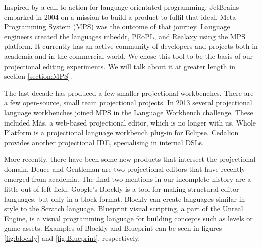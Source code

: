 Inspired by a call to action for language orientated programming\cite{dmitriev2004language}, JetBrains embarked in 2004 on a mission to build a product to fulfil that ideal.  
Meta Programming System (MPS) was the outcome of that journey.   
Language engineers created the languages mbeddr, PEoPL, and Realaxy using the MPS platform.  
It currently has an active community of developers and projects both in academia and in the commercial world. 
We chose this tool to be the basis of our projectional editing experiments. 
We will talk about it at greater length in section \ref{section:MPS}.

The last decade has produced a few smaller projectional workbenches.
There are a few open-source, small team projectional projects. 
In 2013 several projectional language workbenches joined MPS in the Language Workbench challenge\cite{erdweg2015evaluating}.
These included M\'as, a web-based projectional editor, which is no longer with us\cite{MasPostMortem}.
Whole Platform\cite{WholePlatformProductPage} is a projectional language workbench plug-in for Eclipse.
Cedalion\cite{lorenz2011cedalion} provides another projectional IDE, specialising in internal DSLs.

More recently, there have been some new products that intersect the projectional domain.
Deuce\cite{hempel2018deuce} and Gentleman\cite{lafontant2020gentleman_SLR} are two projectional editors that have recently emerged from academia.
The final two mentions in our incomplete history are a little out of left field. 
Google's Blockly\cite{Blockly_ProductPage} is a tool for making structural editor languages, but only in a block format.
Blockly can create languages similar in style to the Scratch language. 
Blueprint visual scripting, a part of the Unreal Engine, is a visual programming language for building concepts such as levels or game assets.
Examples of Blockly and Blueprint can be seen in figures \ref{fig:blockly} and \ref{fig:Blueprint}, respectively.

